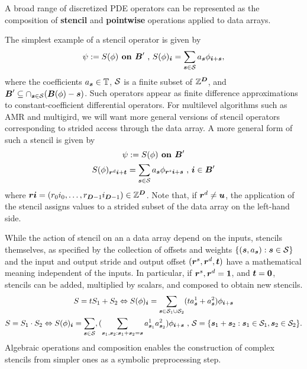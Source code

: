 \documentclass[12pt]{article}
\begin{document}
A broad range of discretized PDE operators can be represented as the composition of
\textbf{stencil} and \textbf{pointwise} operations applied to data arrays. 

The simplest example of a stencil operator is given by 
\begin{gather*}
\psi := S(\phi)  \hbox{\bf{ on }} {\boldsymbol{B}}' \hbox{ , } S(\phi)_{\boldsymbol{i}} = 
\sum \limits_{{\boldsymbol{s}} \in {\mathcal{S}}} a_{\boldsymbol{s}} \phi_{{\boldsymbol{i}} + {\boldsymbol{s}}},
\end{gather*}
where the coefficients $a_{\boldsymbol{s}} \in \mathbb{T}$, ${\mathcal{S}}$ is a finite subset of $\mathbb{Z}^{\boldsymbol{D}}$, and ${\boldsymbol{B}}' \subseteq \cap_{{\boldsymbol{s}} \in {\mathcal{S}}} ({\boldsymbol{B}}(\phi)- {\boldsymbol{s}})$. Such operators appear as finite difference approximations to constant-coefficient differential operators. For multilevel algorithms such as AMR and multigird, we will want more general versions of stencil operators corresponding to strided access through the data array. A more general form of such a stencil is given by
\begin{gather}
\psi := S(\phi)  \hbox{\bf{ on }} {\boldsymbol{B}}' \nonumber \\
 S(\phi)_{{\boldsymbol{r}}^{d} {\boldsymbol{i}} + {\boldsymbol{t}}} = 
\sum \limits_{{\boldsymbol{s}} \in {\mathcal{S}}} a_{\boldsymbol{s}} \phi_{{\boldsymbol{r}}^{s}{\boldsymbol{i}} + {\boldsymbol{s}}} \hbox{ , }
{\boldsymbol{i}} \in {\boldsymbol{B}}'\label{eqn:stridedStencil}
\end{gather}
where ${\boldsymbol{r}} {\boldsymbol{i}} = (r_0 i_0 , \dots , r_{{\boldsymbol{D}}-1} i_{{\boldsymbol{D}}-1}) \in \mathbb{Z}^{\boldsymbol{D}}$. Note that, if ${\boldsymbol{r}}^d \neq {\boldsymbol{u}}$, the application of the stencil assigns values to a strided subset of the data array on the left-hand side. 

While the action of stencil on an a data array depend on the inputs, stencils themselves, as specified by the collection of offsets and weights $\{({\boldsymbol{s}},a_{\boldsymbol{s}}): {\boldsymbol{s}} \in {\mathcal{S}}\}$ and the input and output stride and output offset $({\boldsymbol{r}}^s, {\boldsymbol{r}}^d, {\boldsymbol{t}})$ have a mathematical meaning independent of the inputs. In particular, if ${\boldsymbol{r}}^s, {\boldsymbol{r}}^d = {\boldsymbol{1}}$, and ${\boldsymbol{t}} = {\boldsymbol{0}}$, stencils can be added, multiplied by scalars, and composed to obtain new stencils. 
\begin{gather} 
S = t S_1 + S_2 \Leftrightarrow
S(\phi)_{\boldsymbol{i}} = \sum \limits_{{\boldsymbol{s}} \in {\mathcal{S}}_1 \cup {\mathcal{S}}_2} 
(t a^1_{{\boldsymbol{s}}} + a^2_{{\boldsymbol{s}}}) \phi_{{\boldsymbol{i}} + {\boldsymbol{s}}} \label{eqn:stencilAddition} \\
S = S_1 \cdot S_2 \Leftrightarrow S (\phi)_{\boldsymbol{i}} = \sum \limits_{{\boldsymbol{s}}\in {\mathcal{S}} } ,
(\sum \limits_{{\boldsymbol{s}}_1,{\boldsymbol{s}}_2: {\boldsymbol{s}}_1 + {\boldsymbol{s}}_2 = {\boldsymbol{s}}} a^1_{{\boldsymbol{s}}_1}  a^2_{{\boldsymbol{s}}_2} ) \phi_{{\boldsymbol{i}} + {\boldsymbol{s}}} \hbox{ , } {\mathcal{S}} = \{{\boldsymbol{s}}_1 + {\boldsymbol{s}}_2: {\boldsymbol{s}}_1 \in {\mathcal{S}}_1 , {\boldsymbol{s}}_2 \in {\mathcal{S}}_2\} \label{eqn:stencilComposition}.
\end{gather}
Algebraic operations and composition enables the construction of complex stencils from simpler ones as a symbolic preprocessing step.
\end{document}
